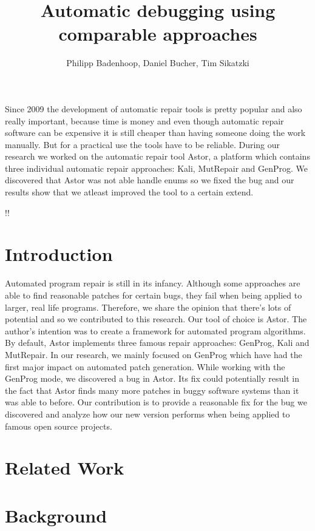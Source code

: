 \documentclass[pdftex,english,oribibl]{llncs}
\title{Automatic debugging using comparable approaches}
\author{Philipp Badenhoop, Daniel Bucher, Tim Sikatzki}
\institute{Humboldt University of Berlin\\Department of Computer Science\\12489 Berlin, Germany}
\makeatletter
\gdef\@keywords{}
\renewenvironment{abstract}{%
  \list{}{\advance\topsep by0.35cm\relax\small%
          \leftmargin=1cm%
          \labelwidth=\z@%
          \listparindent=\z@%
          \itemindent\listparindent%
          \rightmargin\leftmargin}%
          \item[\hskip\labelsep\bfseries\abstractname]}{%
  \if!\@keywords!\else{\item[~]\item[\hskip\labelsep\bfseries\keywordname]\@keywords}\fi%
  \endlist}
\makeatother
\begin{document}
\maketitle

\begin{abstract}
Since 2009 the development of automatic repair tools is pretty popular and also really important, because time is money and even though automatic repair software can be expensive it is still cheaper than having someone doing the work manually. But for a practical use the tools have to be reliable.
During our research we worked on the automatic repair tool Astor, a platform which contains three individual automatic repair approaches: Kali, MutRepair and GenProg. We discovered that Astor was not able handle enums so we fixed the bug and our results show that we atleast improved the tool to a certain extend.

\end{abstract}

\section{Introduction}
Automated program repair is still in its infancy.
Although some approaches are able to find reasonable patches for certain bugs, they fail when being applied to larger, real life programs.
Therefore, we share the opinion that there's lots of potential and so we contributed to this research.
Our tool of choice is Astor.
The author's intention was to create a framework for automated program algorithms.
By default, Astor implements three famous repair approaches: GenProg, Kali and MutRepair.
In our research, we mainly focused on GenProg which have had the first major impact on automated patch generation.
While working with the GenProg mode, we discovered a bug in Astor. 
Its fix could potentially result in the fact that Astor finds many more patches in buggy software systems than it was able to before.
Our contribution is to provide a reasonable fix for the bug we discovered and analyze how our new version performs when being applied to famous open source projects.

\section{Related Work}\label{sec:relatedWork}

\section{Background}\label{sec:background}
\end{document}
